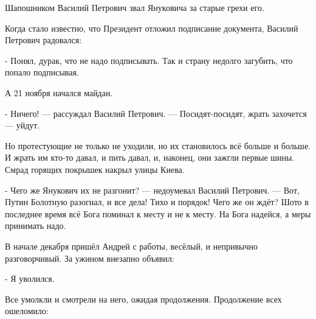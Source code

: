 Шапошником Василий Петрович звал Януковича за старые грехи его.

Когда стало известно, что Президент отложил подписание документа, Василий Петрович радовался:

- Понял, дурак, что не надо подписывать. Так и страну недолго загубить, что попало подписывая.

А 21 ноября начался майдан.

- Ничего! --- рассуждал Василий Петрович. --- Посидят-посидят, жрать захочется --- уйдут.

Но протестующие не только не уходили, но их становилось всё больше и больше. И
жрать им кто-то давал, и пить давал, и, наконец, они зажгли первые шины. Смрад
горящих покрышек накрыл улицы Киева.

- Чего же Янукович их не разгонит? --- недоумевал Василий Петрович. --- Вот, Путин Болотную разогнал, и все дела! Тихо и порядок! Чего же он ждёт? Шото в последнее время всё Бога поминал к месту и не к месту. На Бога надейся, а меры принимать надо.

В начале декабря пришёл Андрей с работы, весёлый, и непривычно разговорчивый. За ужином внезапно объявил:

- Я уволился.

Все умолкли и смотрели на него, ожидая продолжения. Продолжение всех ошеломило:

